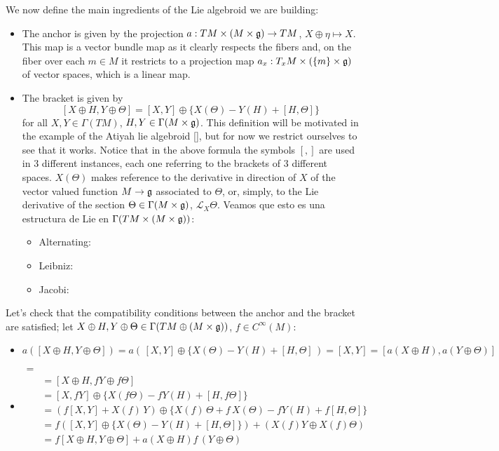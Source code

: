 We now define the main ingredients of the Lie algebroid we are building:
    \begin{itemize}
    \item The anchor is given by the projection $a: TM \times (M \times \mathfrak{g}) \to TM$, $X \oplus \eta \mapsto X$. This map is a vector bundle map as it clearly respects the fibers and, on the fiber over each $m\in M$ it restricts to  a projection map $a_x:T_x M \times (\{m\}\times \mathfrak{g})$ of vector spaces, which is a linear map.
    
    \item The bracket is given by 
    \[
        [X \oplus H, Y \oplus \Theta] = [X, Y] \oplus \{X(\Theta) - Y(H) + [H, \Theta]\}
    \]
    for all $X, Y \in \Gamma(TM)$, $H, Y \in \Gamma(M \times \mathfrak{g})$. This definition will be motivated in the example of the Atiyah lie algebroid \ref{}, but for now we restrict ourselves to see that it works. Notice that in the above formula the symbols $[,]$ are used in $3$ different instances, each one referring to the brackets of $3$ different spaces. $X(\Theta)$ makes reference to the derivative in direction of $X$ of the vector valued function $M \to \mathfrak{g}$ associated to $\Theta$, or, simply, to the Lie derivative of the section $\Theta \in \Gamma(M \times \mathfrak{g})$, $\mathcal L_X \Theta$. Veamos que esto es una estructura de Lie en $\Gamma(TM \times (M \times \mathfrak{g}))$:
        \begin{itemize}
        \item Alternating:
        \item Leibniz:
        \item Jacobi:
        \end{itemize}
    \end{itemize}

Let's check that the compatibility conditions between the anchor and the bracket are satisfied; let $X \oplus H, Y \oplus \Theta \in \Gamma(TM \oplus (M \times \mathfrak{g}))$, $f \in C^\infty(M)$:

    \begin{itemize}
    \item $a([X \oplus H, Y \oplus \Theta]) = a(\, [X, Y] \oplus \{X(\Theta) - Y(H) + [H, \Theta] \,) = [X, Y] = [a(X \oplus H), a(Y \oplus \Theta)]$
    
    \item 
    \begin{align*}
        [X \oplus H, &f\cdot (Y \oplus \Theta)] =\\
        &= [X \oplus H, fY \oplus f\Theta] \\
        &=  [X, fY] \oplus \{X(f\Theta) - fY(H) + [H, f\Theta]\} \\
        &= (f[X, Y] + X(f)\,Y) \oplus \{X(f)\,\Theta + f\,X(\Theta) - fY(H) + f[H, \Theta]\} \\
        &=f([X, Y] \oplus \{ X(\Theta) -Y(H) + [H, \Theta]\} ) + (X(f) Y \oplus X(f)\Theta) \\
        &= f[X \oplus H, Y \oplus \Theta] + a(X \oplus H)f \, (Y \oplus \Theta)
    \end{align*}
    \end{itemize}

